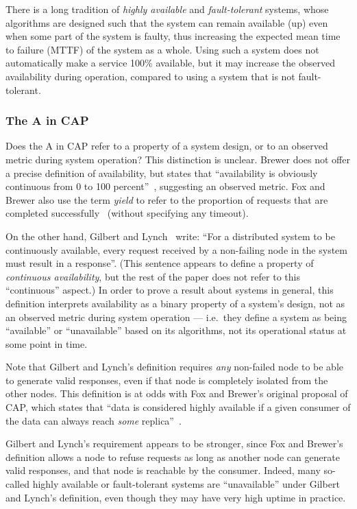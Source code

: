 \documentclass[a4paper,twocolumn,10pt]{article}
\begin{document}
There is a long tradition of \emph{highly available} and \emph{fault-tolerant} systems, whose
algorithms are designed such that the system can remain available (up) even when some part of the
system is faulty, thus increasing the expected mean time to failure (MTTF) of the system as a whole.
Using such a system does not automatically make a service 100\% available, but it may increase the
observed availability during operation, compared to using a system that is not fault-tolerant.

\subsubsection{The A in CAP}\label{sec:a-in-cap}

Does the A in CAP refer to a property of a system design, or to an observed metric during system
operation? This distinction is unclear. Brewer does not offer a precise definition of availability,
but states that ``availability is obviously continuous from 0 to 100 percent''~\cite{Brewer2012ba},
suggesting an observed metric. Fox and Brewer also use the term \emph{yield} to refer to the
proportion of requests that are completed successfully~\cite{Fox1999bs} (without specifying any
timeout).

On the other hand, Gilbert and Lynch~\cite{Gilbert2002il} write: ``For a distributed system to be
continuously available, every request received by a non-failing node in the system must result in a
response''. (This sentence appears to define a property of \emph{continuous availability}, but the
rest of the paper does not refer to this ``continuous'' aspect.) In order to prove a result about
systems in general, this definition interprets availability as a binary property of a system's
design, not as an observed metric during system operation --- i.e.\ they define a system as being
``available'' or ``unavailable'' based on its algorithms, not its operational status at some point
in time.

Note that Gilbert and Lynch's definition requires \emph{any} non-failed node to be able to generate
valid responses, even if that node is completely isolated from the other nodes. This definition is
at odds with Fox and Brewer's original proposal of CAP, which states that ``data is considered
highly available if a given consumer of the data can always reach \emph{some}
replica''~\cite[emphasis original]{Fox1999bs}.

Gilbert and Lynch's requirement appears to be stronger, since Fox and Brewer's definition allows a
node to refuse requests as long as another node can generate valid responses, and that node is
reachable by the consumer. Indeed, many so-called highly available or fault-tolerant systems are
``unavailable'' under Gilbert and Lynch's definition, even though they may have very high uptime in
practice.
\end{document}
